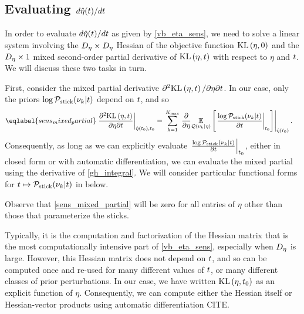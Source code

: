 
\subsection{Evaluating $d\hat\eta(t) / dt$}

In order to evaluate $d\hat\eta(t) / dt$ as given by \eqref{vb_eta_sens}, we
need to solve a linear system involving the ${D_{\eta}} \times {D_{\eta}}$ Hessian of
the objective function $\mathrm{KL}\left(\eta, 0\right)$ and the ${D_{\eta}} \times 1$ mixed
second-order partial derivative of $\mathrm{KL}\left(\eta, t\right)$ with respect to $\eta$ and
$t$.  We will discuss these two tasks in turn.

First, consider the mixed partial derivative $\partial^2 \mathrm{KL}\left(\eta, t\right) /
\partial \eta \partial t$.  In our case, only the priors $\log \mathcal{P}_{\mathrm{stick}}(\nu_{k}
\vert t)$ depend on $t$, and so
%
\begin{align}\eqlabel{sens_mixed_partial}
%
\fracat{\partial^2 \KL{\eta, \t}}
       {\partial \eta \partial \t}
       {\etaopt(\t_0), \t_0} ={}&
\sum_{\k=1}^{\kmax}
    \evalat{
        \frac{\partial}{\partial\eta}
        \expect{\q(\nuk \vert \eta)}
               {\fracat{\log \pstick(\nuk \vert \t)}{\partial \t}{\t_0}
               }
        }
        {\etaopt(\t_0)}.
%
\end{align}
%
Consequently, as long as we can explicitly evaluate $\left.\frac{\log \mathcal{P}_{\mathrm{stick}}(\nu_{k}
\vert t)}{\partial t}\right\vert_{t_0} $, either in closed form or with automatic
differentiation, we can evaluate the mixed partial using the derivative of
\eqref{gh_integral}.  We will consider particular functional forms for
$t \mapsto \mathcal{P}_{\mathrm{stick}}(\nu_{k} \vert t)$ in below.

Observe that \eqref{sens_mixed_partial} will be zero for all entries of
$\eta$ other than those that parameterize the sticks.

Typically, it is the computation and factorization of the Hessian matrix that is
the most computationally intensive part of \eqref{vb_eta_sens}, especially when
${D_{\eta}}$ is large.  However, this Hessian matrix does not depend on $t$, and
so can be computed once and re-used for many different values of $t$, or many
different classes of prior perturbations.  In our case, we have written
$\mathrm{KL}\left(\eta, t_0\right)$ as an explicit function of $\eta$.  Consequently, we can
compute either the Hessian itself or Hessian-vector products using automatic
differentiation CITE.

